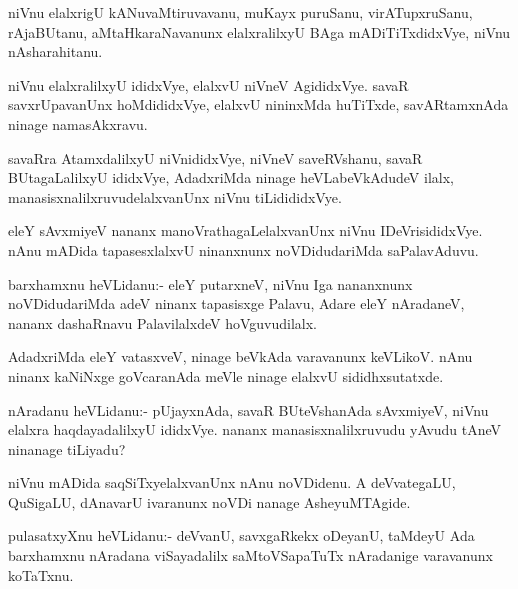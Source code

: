 \documentclass{article}
\begin{document}
\begin{mn}%
niVnu elalxrigU kANuvaMtiruvavanu, muKayx puruSanu, virATupxruSanu,
rAjaBUtanu, aMtaHkaraNavanunx elalxralilxyU BAga mADiTiTxdidxVye,
niVnu nAsharahitanu.
\end{mn}

\begin{mn}
niVnu elalxralilxyU ididxVye, elalxvU niVneV AgididxVye. savaR
savxrUpavanUnx hoMdididxVye, elalxvU nininxMda huTiTxde, savARtamxnAda
ninage namasAkxravu.
\end{mn}

\begin{mn}
savaRra AtamxdalilxyU niVnididxVye, niVneV saveRVshanu, savaR
BUtagaLalilxyU ididxVye, AdadxriMda ninage heVLabeVkAdudeV ilalx,
manasisxnalilxruvudelalxvanUnx niVnu tiLidididxVye.
\end{mn}

\begin{mn}
eleY sAvxmiyeV nananx manoVrathagaLelalxvanUnx niVnu
IDeVrisididxVye. nAnu mADida tapasesxlalxvU ninanxnunx noVDidudariMda saPalavAduvu.
\end{mn}

\begin{mn}
barxhamxnu heVLidanu:- eleY putarxneV, niVnu Iga nananxnunx
noVDidudariMda adeV ninanx tapasisxge Palavu, Adare eleY nAradaneV,
nananx dashaRnavu PalavilalxdeV hoVguvudilalx.
\end{mn}

\begin{mn}%
AdadxriMda eleY vatasxveV, ninage beVkAda varavanunx keVLikoV. nAnu
ninanx kaNiNxge goVcaranAda meVle ninage elalxvU sididhxsutatxde.
\end{mn}

\begin{mn}
nAradanu heVLidanu:- pUjayxnAda, savaR BUteVshanAda sAvxmiyeV, niVnu
elalxra haqdayadalilxyU ididxVye. nananx manasisxnalilxruvudu yAvudu
tAneV ninanage tiLiyadu?
\end{mn}

\begin{mn}%
niVnu mADida saqSiTxyelalxvanUnx nAnu noVDidenu. A deVvategaLU,
QuSigaLU, dAnavarU ivaranunx noVDi nanage AsheyuMTAgide.
\end{mn}

\begin{mn}
pulasatxyXnu heVLidanu:- deVvanU, savxgaRkekx oDeyanU, taMdeyU Ada
barxhamxnu nAradana viSayadalilx saMtoVSapaTuTx nAradanige varavanunx koTaTxnu.
\end{mn}
\end{document}

